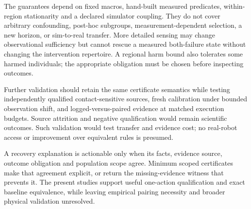 \documentclass[conference]{IEEEtran}
\begin{document}
The guarantees depend on fixed macros, hand-built measured predicates, within-region stationarity and a declared simulator coupling. They do not cover arbitrary confounding, post-hoc subgroups, measurement-dependent selection, a new horizon, or sim-to-real transfer. More detailed sensing may change observational sufficiency but cannot rescue a measured both-failure state without changing the intervention repertoire. A regional harm bound also tolerates some harmed individuals; the appropriate obligation must be chosen before inspecting outcomes.

Further validation should retain the same certificate semantics while testing independently qualified contact-sensitive sources, fresh calibration under bounded observation shift, and logged-versus-paired evidence at matched execution budgets. Source attrition and negative qualification would remain scientific outcomes. Such validation would test transfer and evidence cost; no real-robot access or improvement over equivalent rules is presumed.

A recovery explanation is actionable only when its facts, evidence source, outcome obligation and population scope agree. Minimum scoped certificates make that agreement explicit, or return the missing-evidence witness that prevents it. The present studies support useful one-action qualification and exact baseline equivalence, while leaving empirical pairing necessity and broader physical validation unresolved.

\clearpage


\end{document}
